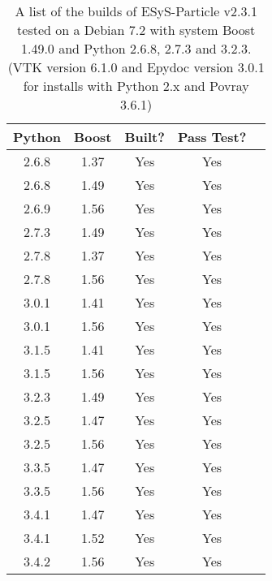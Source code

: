 \begin{table} [h]
    \centering
    \begin{tabular}{|c|c|c|c|c|}
    \hline
    Python & Boost & Built? & Pass Test? \\ \hline
    2.6.8  & 1.37  & Yes    & Yes   \\
    2.6.8  & 1.49  & Yes    & Yes   \\
    2.6.9  & 1.56  & Yes    & Yes   \\
    2.7.3  & 1.49  & Yes    & Yes   \\
    2.7.8  & 1.37  & Yes    & Yes   \\
    2.7.8  & 1.56  & Yes    & Yes   \\
    3.0.1  & 1.41  & Yes    & Yes   \\
    3.0.1  & 1.56  & Yes    & Yes   \\
    3.1.5  & 1.41  & Yes    & Yes   \\
    3.1.5  & 1.56  & Yes    & Yes   \\
    3.2.3  & 1.49  & Yes    & Yes   \\
    3.2.5  & 1.47  & Yes    & Yes   \\
    3.2.5  & 1.56  & Yes    & Yes   \\
    3.3.5  & 1.47  & Yes    & Yes   \\
    3.3.5  & 1.56  & Yes    & Yes   \\
    3.4.1  & 1.47  & Yes    & Yes   \\
    3.4.1  & 1.52  & Yes    & Yes   \\ 
    3.4.2  & 1.56  & Yes    & Yes   \\ \hline
    \end{tabular}
    \caption{A list of the builds of ESyS-Particle v2.3.1 tested on a Debian 7.2 with system Boost 1.49.0 and Python 2.6.8, 2.7.3 and 3.2.3. (VTK version 6.1.0 and Epydoc version 3.0.1 for installs with Python 2.x and Povray 3.6.1)}
\end{table}

